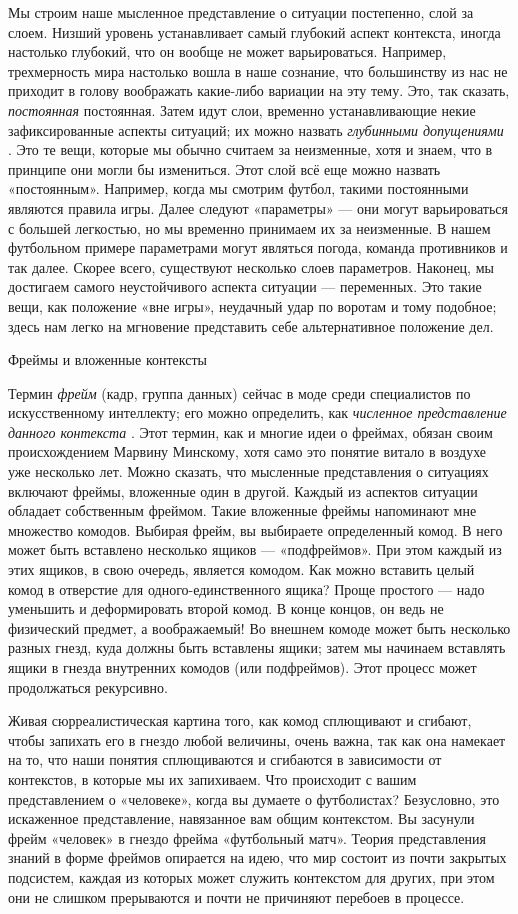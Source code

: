 \documentclass[../main.tex]{subfiles}
\begin{document}
Мы строим наше мысленное представление о ситуации постепенно, слой за слоем. Низший уровень устанавливает самый глубокий аспект контекста, иногда настолько глубокий, что он вообще не может варьироваться. Например, трехмерность мира настолько вошла в наше сознание, что большинству из нас не приходит в голову воображать какие-либо вариации на эту тему. Это, так сказать, \emph{постоянная} постоянная. Затем идут слои, временно устанавливающие некие зафиксированные аспекты ситуаций; их можно назвать \emph{глубинными допущениями} . Это те вещи, которые мы обычно считаем за неизменные, хотя и знаем, что в принципе они могли бы измениться. Этот слой всё еще можно назвать «постоянным». Например, когда мы смотрим футбол, такими постоянными являются правила игры. Далее следуют «параметры» --- они могут варьироваться с большей легкостью, но мы временно принимаем их за неизменные. В нашем футбольном примере параметрами могут являться погода, команда противников и так далее. Скорее всего, существуют несколько слоев параметров. Наконец, мы достигаем самого неустойчивого аспекта ситуации --- переменных. Это такие вещи, как положение «вне игры», неудачный удар по воротам и тому подобное; здесь нам легко на мгновение представить себе альтернативное положение дел.

Фреймы и вложенные контексты

Термин \emph{фрейм} (кадр, группа данных) сейчас в моде среди специалистов по искусственному интеллекту; его можно определить, как \emph{численное представление данного контекста} . Этот термин, как и многие идеи о фреймах, обязан своим происхождением Марвину Минскому, хотя само это понятие витало в воздухе уже несколько лет. Можно сказать, что мысленные представления о ситуациях включают фреймы, вложенные один в другой. Каждый из аспектов ситуации обладает собственным фреймом. Такие вложенные фреймы напоминают мне множество комодов. Выбирая фрейм, вы выбираете определенный комод. В него может быть вставлено несколько ящиков --- «подфреймов». При этом каждый из этих ящиков, в свою очередь, является комодом. Как можно вставить целый комод в отверстие для одного-единственного ящика? Проще простого --- надо уменьшить и деформировать второй комод. В конце концов, он ведь не физический предмет, а воображаемый! Во внешнем комоде может быть несколько разных гнезд, куда должны быть вставлены ящики; затем мы начинаем вставлять ящики в гнезда внутренних комодов (или подфреймов). Этот процесс может продолжаться рекурсивно.

Живая сюрреалистическая картина того, как комод сплющивают и сгибают, чтобы запихать его в гнездо любой величины, очень важна, так как она намекает на то, что наши понятия сплющиваются и сгибаются в зависимости от контекстов, в которые мы их запихиваем. Что происходит с вашим представлением о «человеке», когда вы думаете о футболистах? Безусловно, это искаженное представление, навязанное вам общим контекстом. Вы засунули фрейм «человек» в гнездо фрейма «футбольный матч». Теория представления знаний в форме фреймов опирается на идею, что мир состоит из почти закрытых подсистем, каждая из которых может служить контекстом для других, при этом они не слишком прерываются и почти не причиняют перебоев в процессе.
\end{document}

